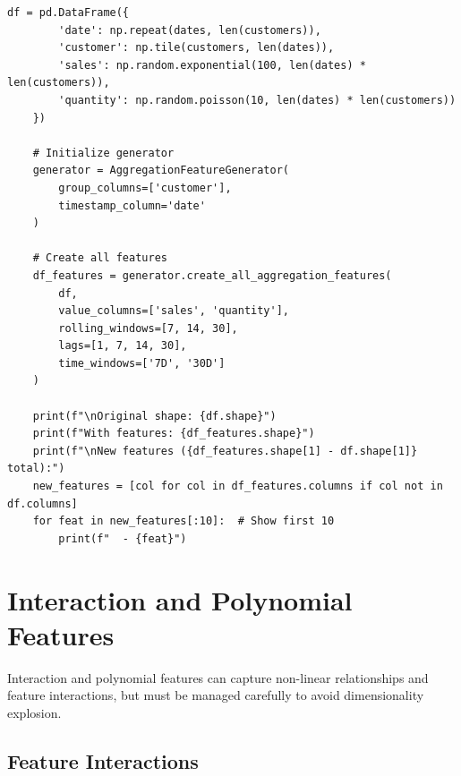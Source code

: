 \begin{lstlisting}[style=python, caption={Scalable Aggregation and Rolling Window Features}]
    df = pd.DataFrame({
        'date': np.repeat(dates, len(customers)),
        'customer': np.tile(customers, len(dates)),
        'sales': np.random.exponential(100, len(dates) * len(customers)),
        'quantity': np.random.poisson(10, len(dates) * len(customers))
    })

    # Initialize generator
    generator = AggregationFeatureGenerator(
        group_columns=['customer'],
        timestamp_column='date'
    )

    # Create all features
    df_features = generator.create_all_aggregation_features(
        df,
        value_columns=['sales', 'quantity'],
        rolling_windows=[7, 14, 30],
        lags=[1, 7, 14, 30],
        time_windows=['7D', '30D']
    )

    print(f"\nOriginal shape: {df.shape}")
    print(f"With features: {df_features.shape}")
    print(f"\nNew features ({df_features.shape[1] - df.shape[1]} total):")
    new_features = [col for col in df_features.columns if col not in df.columns]
    for feat in new_features[:10]:  # Show first 10
        print(f"  - {feat}")
\end{lstlisting}

\section{Interaction and Polynomial Features}

Interaction and polynomial features can capture non-linear relationships and feature interactions, but must be managed carefully to avoid dimensionality explosion.

\subsection{Feature Interactions}

